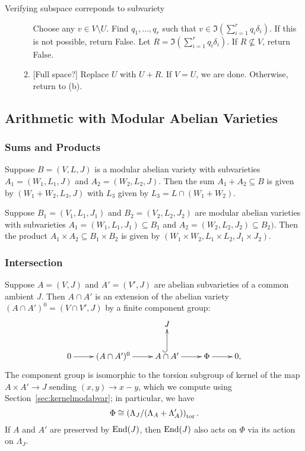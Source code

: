 \documentclass{article}
\begin{document}
\begin{algorithm}{Verifying subspace correponds to subvariety}
\begin{enumerate}
\begin{enumerate}
                    Choose any $v\in V\setminus U$. Find $q_1,\ldots,q_r$
                    such that $v\in \Im \left(\sum_{i=1} ^r q_i
                    \delta_i\right)$. If this is not possible, return
                    False. Let $R = \Im \left(\sum_{i=1} ^r q_i
                    \delta_i\right)$. If $R\not\subseteq V$, return False.  
                \item{} [Full space?]
                    Replace $U$ with $U+R$. If $V=U$, we are done. Otherwise,
                    return to (b).
            \end{enumerate}
    \end{enumerate}
\end{algorithm}


\subsection{Arithmetic with Modular Abelian Varieties}

\subsubsection{Sums and Products}

Suppose $B=(V, L, J)$ is a modular abelian variety with subvarieties $A_1=(W_1,
L_1, J)$ and $A_2=(W_2, L_2, J)$. Then the sum $A_1+A_2\subseteq B$ is given by
$(W_1+W_2, L_3, J)$ with $L_3$ given by $L_3 = L\cap (W_1+W_2)$.

Suppose $B_1=(V_1, L_1, J_1)$ and $B_2=(V_2, L_2, J_2)$ are modular abelian
varieties with subvarieties $A_1=(W_1, L_1, J_1)\subseteq B_1$ and $A_2=(W_2,
L_2, J_2)\subseteq B_2)$. Then the product $A_1\times A_2\subseteq B_1\times
B_2$ is given by $(W_1\times W_2, L_1\times L_2, J_1\times J_2)$.

\subsubsection{Intersection}


Suppose $A = (V,J)$ and $A' = (V', J)$ are abelian subvarieties of a
common ambient $J$.  Then $A\cap A'$ is an extension of the abelian
variety $(A\cap A')^0 = (V\cap V', J)$ by a finite component group:
$$
\xymatrix{
   & & J & & \\
   0\ar[r]& (A\cap A')^0 \ar[r]&  A\cap A'\ar@{^(->}[u] \ar[r]& \Phi\ar[r] & 0,
}
$$
The component group is isomorphic to the torsion subgroup of kernel of
the map $A \times A' \to J$ sending $(x,y)\to x-y$, which we compute
using Section~\ref{sec:kernelmodabvar}; in particular, we have
$$
   \Phi \cong \left( \Lambda_J/(\Lambda_A + \Lambda_A')\right)_{\operatorname{tor}}.
$$
If $A$ and $A'$ are preserved by $\operatorname{End}(J)$, then $\operatorname{End}(J)$ also
acts on $\Phi$ via its action on $\Lambda_J$.
\end{document}

